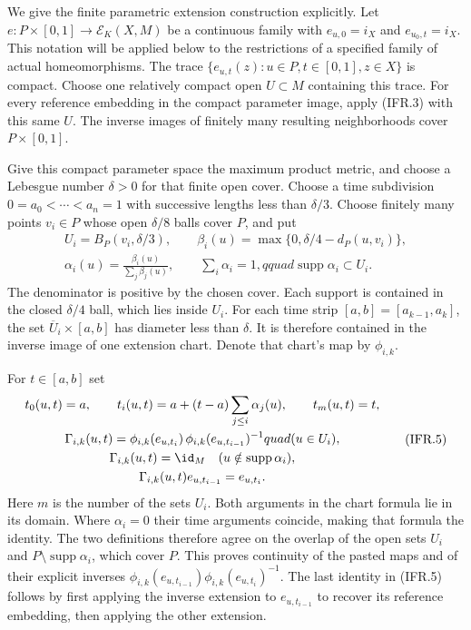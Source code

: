 We give the finite parametric extension construction explicitly.
Let $e:P\times[0,1]\to\mathcal E_K(X,M)$ be a continuous family with
$e_{u,0}=i_X$ and $e_{u_0,t}=i_X$. This notation will be applied below
to the restrictions of a specified family of actual homeomorphisms.
The trace $\{e_{u,t}(z):u\in P,t\in[0,1],z\in X\}$ is compact.
Choose one relatively compact open $U\subset M$ containing this trace.
For every reference embedding in the compact parameter image, apply
(IFR.3) with this same $U$. The inverse images of finitely many resulting
neighborhoods cover $P\times[0,1]$.

Give this compact parameter space the maximum product metric, and
choose a Lebesgue number $\delta>0$ for that finite open cover.
Choose a time subdivision $0=a_0<\cdots<a_n=1$ with successive
lengths less than $\delta/3$. Choose finitely many points $v_i\in P$
whose open $\delta/8$ balls cover $P$, and put
\[
\begin{gathered}
 U_i=B_P(v_i,\delta/3),\qquad
 \beta_i(u)=\max\{0,\delta/4-d_P(u,v_i)\},\\
 \alpha_i(u)=\frac{\beta_i(u)}{\sum_j\beta_j(u)},\qquad
 \sum_i\alpha_i=1,qquad \operatorname{supp}\alpha_i\subset U_i.
\end{gathered}                                                    \tag{IFR.4}
\]
The denominator is positive by the chosen cover. Each support is
contained in the closed $\delta/4$ ball, which lies inside $U_i$.
For each time strip $[a,b]=[a_{k-1},a_k]$, the set
$\overline U_i\times[a,b]$ has diameter less than $\delta$.
It is therefore contained in the inverse image of one extension chart.
Denote that chart's map by $\phi_{i,k}$.

For $t\in[a,b]$ set
\[
\begin{gathered}
 t_0(u,t)=a,\qquad
 t_i(u,t)=a+(t-a)\sum_{j\leq i}\alpha_j(u),\qquad t_m(u,t)=t,\\
 \Gamma_{i,k}(u,t)=
 \phi_{i,k}(e_{u,t_i})\,
               \phi_{i,k}(e_{u,t_{i-1}})^{-1}quad(u\in U_i),\\
 \Gamma_{i,k}(u,t)=\id_M\quad(u\notin\operatorname{supp}\alpha_i),\\
 \Gamma_{i,k}(u,t)e_{u,t_{i-1}}=e_{u,t_i}.
\end{gathered}                                                    \tag{IFR.5}
\]
Here $m$ is the number of the sets $U_i$. Both arguments in the chart
formula lie in its domain. Where $\alpha_i=0$ their time arguments
coincide, making that formula the identity. The two definitions therefore
agree on the overlap of the open sets $U_i$ and
$P\setminus\operatorname{supp}\alpha_i$, which cover $P$.
This proves continuity of the pasted maps and of their explicit inverses
$\phi_{i,k}(e_{u,t_{i-1}})\phi_{i,k}(e_{u,t_i})^{-1}$.
The last identity in (IFR.5) follows by first applying the inverse
extension to $e_{u,t_{i-1}}$ to recover its reference embedding,
then applying the other extension.

